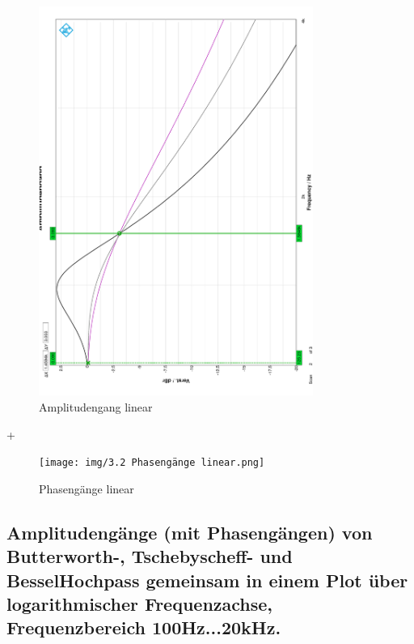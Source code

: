 \begin{figure}[H]
    \begin{center}
        \includegraphics[width=0.8\textwidth, angle =-90]{img/3.2 Amplitudengang linear.png}
        \caption{Amplitudengang linear}
        \label{fig:A3_amp}
    \end{center}
\end{figure}
+

\begin{figure}[H]
    \begin{center}
        \texttt{[image: img/3.2 Phasengänge linear.png]}
        \caption{Phasengänge linear}
        \label{fig:A3_phase}
    \end{center}
\end{figure}






\subsection{Amplitudengänge (mit Phasengängen) von Butterworth-, Tschebyscheff- und BesselHochpass gemeinsam in einem Plot über logarithmischer Frequenzachse, Frequenzbereich 100Hz...20kHz. }


